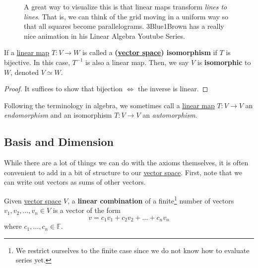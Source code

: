 \begin{definition}
\begin{figure}[H]
      \caption{A great way to visualize this is that linear maps transform \textit{lines to lines}. That is, we can think of the grid moving in a uniform way so that all squares become parallelograms. 3Blue1Brown has a really nice animation in his Linear Algebra Youtube Series.}
      \label{fig:linear_map}
    \end{figure}
  \end{definition}

  \begin{definition}[Isomorphism]
    \label{def:isomorphism}
    If a \hyperref[def:linear_map]{linear map} $T: V \to W$ is called a \textbf{(\hyperref[def:vector-space]{vector space}) isomorphism} if $T$ is bijective. In this case, $T^{-1}$ is also a linear map. Then, we say $V$ is \textbf{isomorphic} to $W$, denoted $V \simeq W$. 
  \end{definition}
  \begin{proof}
    It suffices to show that bijection $\iff$ the inverse is linear. 
  \end{proof}

  Following the terminology in algebra, we sometimes call a \hyperref[def:linear_map]{linear map} $T: V \to V$ an \textit{endomorphism} and an isomorphism $T: V \to V$ an \textit{automorphism}. 

\subsection{Basis and Dimension}

  While there are a lot of things we can do with the axioms themselves, it is often convenient to add in a bit of structure to our \hyperref[def:vector-space]{vector space}. First, note that we can write out vectors as sums of other vectors. 

  \begin{definition}
    \label{def:linear-combination}
    Given \hyperref[def:vector-space]{vector space} $V$, a \textbf{linear combination} of a finite\footnote{We restrict ourselves to the finite case since we do not know how to evaluate series yet.} number of vectors $v_1, v_2, \ldots, v_n \in V$ is a vector of the form 
    \begin{equation}
      v = c_1 v_1 + c_2 v_2 + \ldots + c_n v_n
    \end{equation}
    where $c_1, \ldots, c_n \in \mathbb{F}$. 
  \end{definition}

